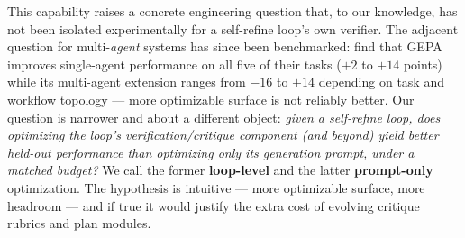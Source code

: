 \documentclass[11pt]{article}
\begin{document}
This capability raises a concrete engineering question that, to our knowledge,
has not been isolated experimentally for a self-refine loop's own verifier. The
adjacent question for multi-\emph{agent} systems has since been benchmarked:
\citet{bai2026masprompt} find that GEPA improves single-agent performance on all five of
their tasks ($+2$ to $+14$ points) while its multi-agent extension ranges from $-16$ to
$+14$ depending on task and workflow topology --- more optimizable surface is not reliably
better. Our question is narrower and about a different object: \emph{given a self-refine loop, does
optimizing the loop's verification/critique component (and beyond) yield better
held-out performance than optimizing only its generation prompt, under a matched
budget?} We call the former \textbf{loop-level} and the latter
\textbf{prompt-only} optimization. The hypothesis is intuitive --- more
optimizable surface, more headroom --- and if true it would justify the extra
cost of evolving critique rubrics and plan modules.
\end{document}
